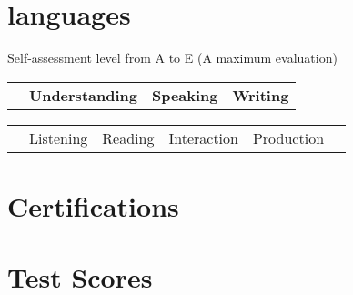 \documentclass[11pt,a4paper,sans]{moderncv}   %
\begin{document}
\begin{CJK}{UTF8}{gbsn}
\clearpage

\section{languages}

\hspace{25mm}\small Self-assessment level from A to E (A maximum evaluation)\normalsize
\vspace{5mm}

\begin{tabular}{p{67mm} p{40mm} p{40mm} p{20mm}}
& \textbf{Understanding} & \textbf{Speaking} & \textbf{Writing} \\
\end{tabular}

\begin{tabular}{p{67mm} p{20mm} p{20mm} p{20mm} p{20mm} p{20mm}}
& Listening & Reading & Interaction & Production & \\
\end{tabular}


\section{Certifications}

\section{Test Scores}


\end{CJK}
\end{document}
